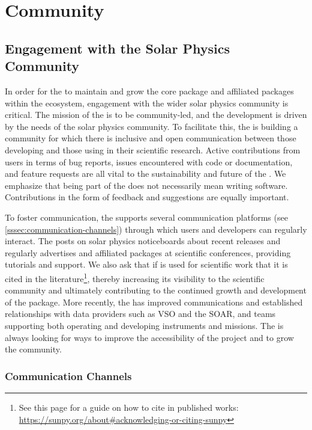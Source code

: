 \section{Community}
\label{sec:community}

\subsection{Engagement with the Solar Physics Community}
\label{ssec:engagement-with-the-solar-physics-community}

In order for the \sunpyproj to maintain and grow the \sunpypkg core package and affiliated packages within the ecosystem, engagement with the wider solar physics community is critical.
The mission of the \sunpyproj is to be community-led, and the development is driven by the needs of the solar physics community.
To facilitate this, the \sunpyproj is building a community for which there is inclusive and open communication between those developing \sunpypkg and those using \sunpypkg in their scientific research.
Active contributions from users in terms of bug reports, issues encountered with code or documentation, and feature requests are all vital to the sustainability and future of the \sunpyproj.
We emphasize that being part of the \sunpyproj does not necessarily mean writing software. Contributions in the form of feedback and suggestions are equally important.

To foster communication, the \sunpyproj supports several communication platforms (see \autoref{sssec:communication-channels}) through which users and developers can regularly interact.
The \sunpyproj posts on solar physics noticeboards about recent releases and regularly advertises \sunpypkg and affiliated packages at scientific conferences, providing tutorials and support.
We also ask that if \sunpypkg is used for scientific work that it is cited in the literature\footnote{See this page for a guide on how to cite \sunpypkg in published works: \url{https://sunpy.org/about\#acknowledging-or-citing-sunpy}}, thereby increasing its visibility to the scientific community and ultimately contributing to the continued growth and development of the package.
More recently, the \sunpyproj has improved communications and established relationships with data providers such as VSO and the SOAR, and teams supporting both operating and developing instruments and missions.
The \sunpyproj is always looking for ways to improve the accessibility of the project and to grow the community.

\subsubsection{Communication Channels}
\label{sssec:communication-channels}

